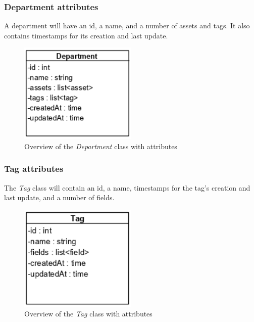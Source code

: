\subsubsection{Department attributes}
A department will have an id, a name, and a number of assets and tags. It also contains timestamps for its creation and last update.
\begin{figure}[H]
    \centering
    \includegraphics[width=0.5\textwidth]{figures/Classes/DepartmentAttributes.png}
    \caption{Overview of the \textit{Department} class with attributes}
    \label{fig:DepartmentWithAttributes}
\end{figure}

\subsubsection{Tag attributes}
The \textit{Tag} class will contain an id, a name, timestamps for the tag's creation and last update, and a number of fields.
\begin{figure}[H]
    \centering
    \includegraphics[width=0.5\textwidth]{figures/Classes/TagAttributes.png}
    \caption{Overview of the \textit{Tag} class with attributes}
    \label{fig:TagWithAttributes}
\end{figure}


